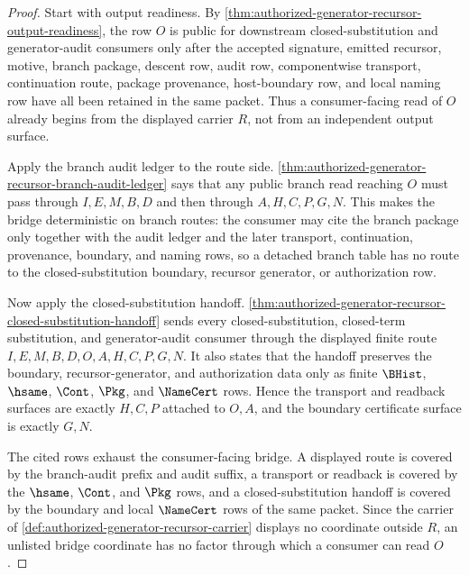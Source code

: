 \begin{proof}
Start with output readiness. By \autoref{thm:authorized-generator-recursor-output-readiness}, the row $O$ is public for downstream closed-substitution and generator-audit consumers only after the accepted signature, emitted recursor, motive, branch package, descent row, audit row, componentwise transport, continuation route, package provenance, host-boundary row, and local naming row have all been retained in the same packet. Thus a consumer-facing read of $O$ already begins from the displayed carrier $R$, not from an independent output surface.

Apply the branch audit ledger to the route side. \autoref{thm:authorized-generator-recursor-branch-audit-ledger} says that any public branch read reaching $O$ must pass through $I,E,M,B,D$ and then through $A,H,C,P,G,N$. This makes the bridge deterministic on branch routes: the consumer may cite the branch package only together with the audit ledger and the later transport, continuation, provenance, boundary, and naming rows, so a detached branch table has no route to the closed-substitution boundary, recursor generator, or authorization row.

Now apply the closed-substitution handoff. \autoref{thm:authorized-generator-recursor-closed-substitution-handoff} sends every closed-substitution, closed-term substitution, and generator-audit consumer through the displayed finite route $I,E,M,B,D,O,A,H,C,P,G,N$. It also states that the handoff preserves the boundary, recursor-generator, and authorization data only as finite $\BHist$, $\hsame$, $\Cont$, $\Pkg$, and $\NameCert$ rows. Hence the transport and readback surfaces are exactly $H,C,P$ attached to $O,A$, and the boundary certificate surface is exactly $G,N$.

The cited rows exhaust the consumer-facing bridge. A displayed route is covered by the branch-audit prefix and audit suffix, a transport or readback is covered by the $\hsame$, $\Cont$, and $\Pkg$ rows, and a closed-substitution handoff is covered by the boundary and local $\NameCert$ rows of the same packet. Since the carrier of \autoref{def:authorized-generator-recursor-carrier} displays no coordinate outside $R$, an unlisted bridge coordinate has no factor through which a consumer can read $O$.
\end{proof}

